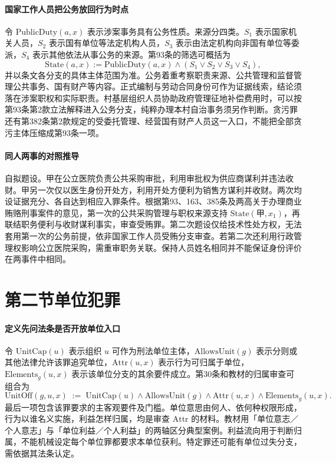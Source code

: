 \paragraph{国家工作人员\quad 把公务放回行为时点}
令 \(\mathrm{PublicDuty}(a,x)\) 表示涉案事务具有公务性质。来源分四类。\(S_1\) 表示国家机关人员，\(S_2\) 表示国有单位等法定机构人员，\(S_3\) 表示由法定机构向非国有单位等委派，\(S_4\) 表示其他依法从事公务的来源。第93条的筛选可概括为
\[
 \mathrm{State}(a,x)
  :=\mathrm{PublicDuty}(a,x)\land(S_1\lor S_2\lor S_3\lor S_4),
\]
并以条文各分支的具体主体范围为准。公务着重考察职责来源、公共管理和监督管理公共事务、国有财产等内容。正式编制与劳动合同身份可作为证据线索，结论须落在涉案职权和实际职责。村基层组织人员协助政府管理征地补偿费用时，可以按第93条第2款立法解释进入公务分支，纯粹办理本村自治事务须另作判断。贪污罪还有第382条第2款规定的受委托管理、经营国有财产人员这一入口，不能把全部贪污主体压缩成第93条一项。

\paragraph{同人两事的对照推导}
自拟题设。甲在公立医院负责公共采购审批，利用审批权为供应商谋利并违法收财。甲另一次仅以医生身份开处方，利用开处方便利为销售方谋利并收财。两次均设证据充分、各自达到相应入罪条件。根据第93、163、385条及两高关于办理商业贿赂刑事案件的意见，第一次的公共采购管理与职权来源支持 \(\mathrm{State}(\text{甲},x_1)\)，再联结职务便利与收财谋利事实，审查受贿罪。第二次题设仅给技术性处方权，无法套用第一次的公务前提，依非国家工作人员受贿分支审查。若第二次还利用行政管理权影响公立医院采购，需重审职务关联。保持人员姓名相同并不能保证身份评价在两事件中相同。

\section{第二节\quad 单位犯罪}

\paragraph{定义\quad 先问法条是否开放单位入口}
令 \(\mathrm{UnitCap}(u)\) 表示组织 \(u\) 可作为刑法单位主体，\(\mathrm{AllowsUnit}(g)\) 表示分则或其他法律允许该罪追究单位，\(\mathrm{Attr}(u,x)\) 表示行为可归属于单位，\(\mathrm{Elements}_g(u,x)\) 表示该单位分支的其余要件成立。第30条和教材的归属审查可组合为
\[
 \mathrm{UnitOff}(g,u,x)
 \;:=\;\mathrm{UnitCap}(u)\land\mathrm{AllowsUnit}(g)
      \land\mathrm{Attr}(u,x)\land\mathrm{Elements}_g(u,x).
\]
最后一项包含该罪要求的主客观要件及门槛。单位意思由何人、依何种权限形成，行为以谁名义实施，利益怎样归属，均是审查 \(\mathrm{Attr}\) 的材料。教材用「单位意志／个人意志」与「单位利益／个人利益」的两轴区分典型案例。利益流向用于判断归属，不能机械设定每个单位罪都要求本单位获利。特定罪还可能有单位过失分支，需依据其法条认定。


